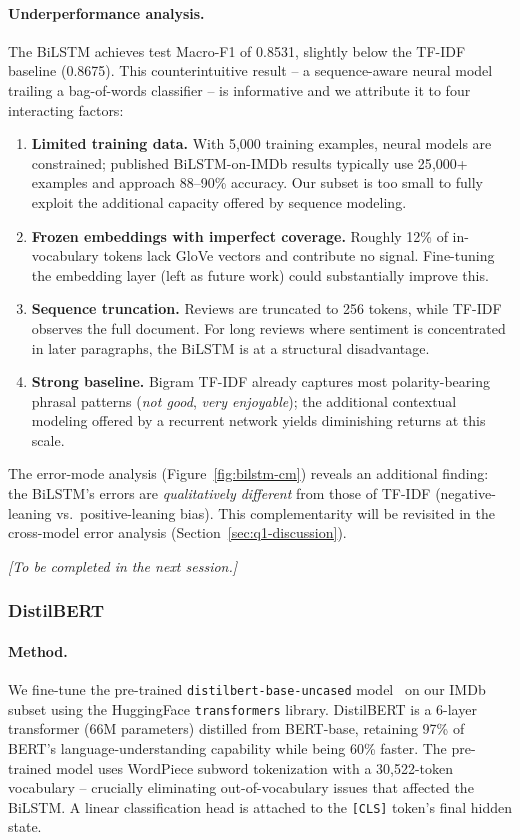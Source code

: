 \documentclass[11pt,a4paper]{article}
\begin{document}
\paragraph{Underperformance analysis.} The BiLSTM achieves test Macro-F1 of 0.8531, slightly below the TF-IDF baseline (0.8675). This counterintuitive result -- a sequence-aware neural model trailing a bag-of-words classifier -- is informative and we attribute it to four interacting factors:
\begin{enumerate}[noitemsep]
    \item \textbf{Limited training data.} With 5{,}000 training examples, neural models are constrained; published BiLSTM-on-IMDb results typically use 25{,}000+ examples and approach 88--90\% accuracy. Our subset is too small to fully exploit the additional capacity offered by sequence modeling.
    \item \textbf{Frozen embeddings with imperfect coverage.} Roughly 12\% of in-vocabulary tokens lack GloVe vectors and contribute no signal. Fine-tuning the embedding layer (left as future work) could substantially improve this.
    \item \textbf{Sequence truncation.} Reviews are truncated to 256 tokens, while TF-IDF observes the full document. For long reviews where sentiment is concentrated in later paragraphs, the BiLSTM is at a structural disadvantage.
    \item \textbf{Strong baseline.} Bigram TF-IDF already captures most polarity-bearing phrasal patterns (\emph{not good}, \emph{very enjoyable}); the additional contextual modeling offered by a recurrent network yields diminishing returns at this scale.
\end{enumerate}
The error-mode analysis (Figure~\ref{fig:bilstm-cm}) reveals an additional finding: the BiLSTM's errors are \emph{qualitatively different} from those of TF-IDF (negative-leaning vs.\ positive-leaning bias). This complementarity will be revisited in the cross-model error analysis (Section~\ref{sec:q1-discussion}).


\textit{[To be completed in the next session.]}

\subsubsection{DistilBERT}
\label{sec:q1-bert}
\paragraph{Method.} We fine-tune the pre-trained \texttt{distilbert-base-uncased} model~\cite{sanh2019distilbert} on our IMDb subset using the HuggingFace \texttt{transformers} library. DistilBERT is a 6-layer transformer (66M parameters) distilled from BERT-base, retaining 97\% of BERT's language-understanding capability while being 60\% faster. The pre-trained model uses WordPiece subword tokenization with a 30{,}522-token vocabulary -- crucially eliminating out-of-vocabulary issues that affected the BiLSTM. A linear classification head is attached to the \texttt{[CLS]} token's final hidden state.
\end{document}
